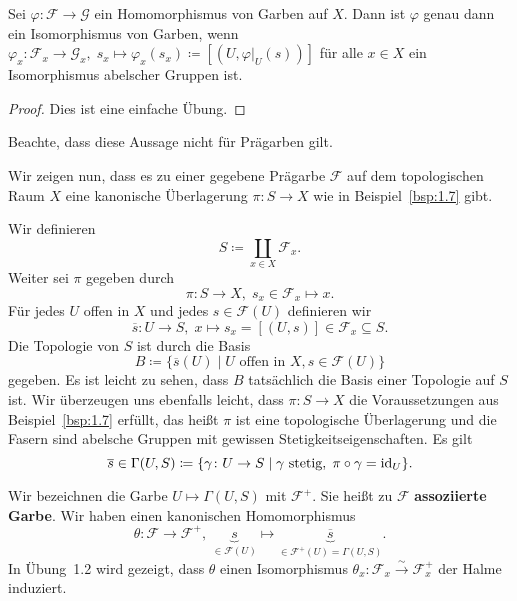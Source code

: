 \begin{prop}
	Sei $\varphi \colon \mathcal{F} \to \mathcal{G}$ ein Homomorphismus von Garben auf $X$. Dann ist $\varphi$ genau dann ein Isomorphismus von Garben, wenn $\varphi_x \colon \mathcal{F}_x \to \mathcal{G}_x,\; s_x \mapsto \varphi_x(s_x) \coloneqq [(U,\varphi\vert_U(s))]$ für alle $x \in X$ ein Isomorphismus abelscher Gruppen ist.
	\begin{proof}
		Dies ist eine einfache Übung.
	\end{proof}
	Beachte, dass diese Aussage nicht für Prägarben gilt.
\end{prop}

\begin{bem}
\label{bem:1.15}
	Wir zeigen nun, dass es zu einer gegebene Prägarbe $\mathcal{F}$ auf dem topologischen Raum $X$ eine kanonische Überlagerung $\pi\colon S \to X$ wie in Beispiel~\ref{bsp:1.7} gibt.

	Wir definieren
	\[
		S\coloneqq \coprod_{x\in X} \mathcal{F}_x.
	\]
	Weiter sei $\pi$ gegeben durch
	\[
		\pi\colon S \to X,\; s_x\in \mathcal{F}_x \mapsto x.
	\]
	Für jedes $U$ offen in $X$ und jedes $s \in \mathcal{F}(U)$ definieren wir
	\[
		\overline{s}\colon U \to S,\; x \mapsto s_x = [(U,s)] \in \mathcal{F}_x \subseteq S.
	\]
	Die Topologie von $S$ ist durch die Basis
	\[
		B \coloneqq \{\overline{s}(U) \mid U \text{ offen in } X, s \in \mathcal{F}(U)\}
	\]
	gegeben. Es ist leicht zu sehen, dass $B$ tatsächlich die Basis einer Topologie auf $S$ ist. Wir überzeugen uns ebenfalls leicht, dass $\pi\colon S \to X$ die Voraussetzungen aus Beispiel~\ref{bsp:1.7} erfüllt, das heißt $\pi$ ist eine topologische Überlagerung und die Fasern sind abelsche Gruppen mit gewissen Stetigkeitseigenschaften. Es gilt
	\[
		\overline{s} \in \Gamma(U,S) \coloneqq \{\gamma\colon U \to S \mid \gamma \text{ stetig},\; \pi \circ \gamma = \operatorname{id}_U\}.
	\]
\end{bem}

\begin{defn}
	Wir bezeichnen die Garbe $U \mapsto \Gamma(U,S)$ mit $\mathcal{F}^+$. Sie heißt zu $\mathcal{F}$ \textbf{assoziierte Garbe}. Wir haben einen kanonischen Homomorphismus
	\[
		\theta\colon \mathcal{F} \to \mathcal{F}^+,\; \underbrace{s}_{\in \mathcal{F}(U)} \mapsto \underbrace{\overline{s}}_{\in \mathcal{F}^+(U)=\Gamma(U,S)}.
	\]
	In Übung~1.2 wird gezeigt, dass $\theta$ einen Isomorphismus $\theta_x \colon \mathcal{F}_x \overset{\sim}{\to} \mathcal{F}^+_x$ der Halme induziert.
\end{defn}

